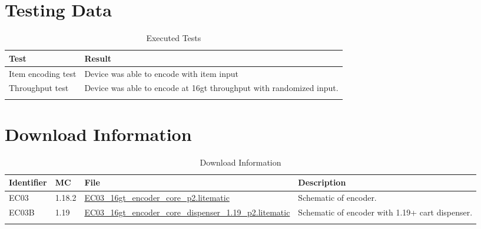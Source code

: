 \documentclass[10pt]{datasheet}
\begin{document}
\section{Testing Data}
\begin{table}[h]
\caption{Executed Tests}
\begin{tabularx}{\textwidth}{l | X}
    \thickhline
    \textbf{Test} & \textbf{Result} \\
    \hline
    Item encoding test & Device was able to encode with item input \\
    \hline
    Throughput test & Device was able to encode at 16gt throughput with randomized input. \\
    \thickhline
\end{tabularx}
\end{table}

\section{Download Information}
\begin{table}[h]
    \caption{Download Information}
    \begin{tabularx}{\textwidth}{l | l | l | X}
        \thickhline
        \textbf{Identifier} & \textbf{MC} & \textbf{File} & \textbf{Description} \\
        \hline
        EC03 & 1.18.2 & \href{https://github.com/Soontech-Annals/Archive/blob/8413f90a054b6c415703bae02badeba7541344f6/Archive/encoders/EC03\%2016gt\%20Item\%20Encoder/EC03\_16gt\_encoder\_core\_p2.litematic?raw=1}{EC03\_16gt\_encoder\_core\_p2.litematic} & Schematic of encoder. \\
        \hline
        EC03B & 1.19 & \href{https://github.com/Soontech-Annals/Archive/blob/8413f90a054b6c415703bae02badeba7541344f6/Archive/encoders/EC03\%2016gt\%20Item\%20Encoder/EC03\_16gt\_encoder\_core\_dispenser\_1.19\_p2.litematic?raw=1}{EC03\_16gt\_encoder\_core\_dispenser\_1.19\_p2.litematic} & Schematic of encoder with 1.19+ cart dispenser. \\
        \thickhline
    \end{tabularx}
\end{table}
\end{document}
